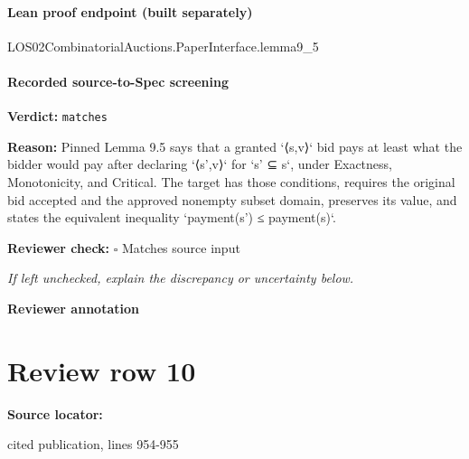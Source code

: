 \documentclass[10pt]{article}
\newcommand{\reviewerbox}{%
  \par\noindent\fbox{\parbox{0.96\linewidth}{\rule{0pt}{0.38in}}}\par
}
\newcommand{\reviewmatch}[1]{%
  \par\noindent\textbf{Reviewer check:} $\square$\; #1\par
  \noindent\emph{If left unchecked, explain the discrepancy or uncertainty below.}\par
}
\begin{document}
\paragraph{Lean proof endpoint (built separately)}\begin{ReviewVerbatim}
LOS02CombinatorialAuctions.PaperInterface.lemma9_5
\end{ReviewVerbatim}

\paragraph{Recorded source-to-Spec screening}
\textbf{Verdict:} \texttt{matches}
\\
{\raggedright
\textbf{Reason:} Pinned Lemma 9.\allowbreak{}5 says that a granted `⟨s,v⟩` bid pays at least what the bidder would pay after declaring `⟨s',v⟩` for `s' ⊆ s`, under Exactness, Monotonicity, and Critical.\allowbreak{} The target has those conditions, requires the original bid accepted and the approved nonempty subset domain, preserves its value, and states the equivalent inequality `payment(s') ≤ payment(s)`.\allowbreak{}
\par}
\reviewmatch{Matches source input}
\noindent\textbf{Reviewer annotation}\par
\reviewerbox
\clearpage
\hypertarget{source-claim-f1a1d0f6c984f3dc}{}
\section*{Review row 10}
\textbf{Source locator:} {\footnotesize\raggedright cited publication, lines 954-\allowbreak{}955\par}
\end{document}
